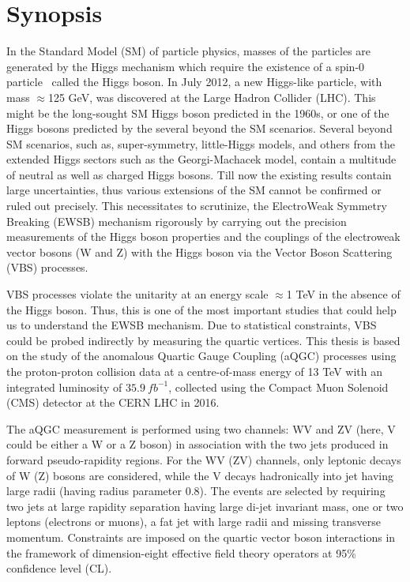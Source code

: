 \chapter*{Synopsis}
In the Standard Model (SM) of particle physics, masses of the particles are generated by the Higgs mechanism which require the existence of a spin-0 particle~\cite{Higgs1964,Higgs1964a,Higgs1966,Englert1964,Kibble1967,Guralnik1964} called the Higgs boson. In July 2012, a new Higgs-like particle, with mass $\approx$125 GeV, was discovered at the Large Hadron Collider (LHC). This might be the long-sought SM Higgs boson predicted in the 1960s, or one of the Higgs bosons predicted by the several beyond the SM scenarios. Several beyond SM scenarios, such as, super-symmetry, little-Higgs models, and others from the extended Higgs sectors such as the Georgi-Machacek model, contain a multitude of neutral as well as charged Higgs bosons. Till now the existing results contain large uncertainties, thus various extensions of the SM cannot be confirmed or ruled out precisely.
This necessitates to scrutinize, the ElectroWeak Symmetry Breaking (EWSB) mechanism rigorously by carrying out the precision measurements of the Higgs boson properties and the couplings of the electroweak vector bosons (W and Z) with the Higgs boson via the Vector Boson Scattering (VBS) processes.

VBS processes violate the unitarity at an energy scale $\approx$1 TeV in the absence of the Higgs boson. Thus, this is one of the most important studies that could help us to understand the EWSB mechanism. Due to statistical constraints, VBS could be probed indirectly by measuring the quartic vertices. This thesis is based on the study of the anomalous Quartic Gauge Coupling (aQGC) processes using the proton-proton collision data at a centre-of-mass energy of 13 TeV with an integrated luminosity of $35.9~fb^{-1}$, collected using the Compact Muon Solenoid (CMS) detector at the CERN LHC in 2016.

The aQGC measurement is performed using two channels: WV and ZV (here, V could be either a W or a Z boson) in association with the two jets produced in forward pseudo-rapidity regions. For the WV (ZV) channels, only leptonic decays of W (Z) bosons are considered, while the V decays hadronically into jet having large radii (having radius parameter 0.8). The events are selected by requiring two jets at large rapidity separation having large di-jet invariant mass, one or two leptons (electrons or muons), a fat jet with large radii and missing transverse momentum. Constraints are imposed on the quartic vector boson interactions in the framework of dimension-eight effective field theory operators at 95\% confidence level (CL).

